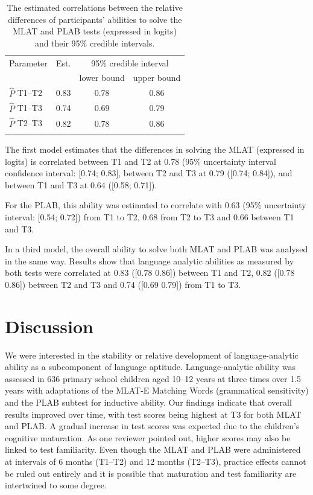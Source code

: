 \documentclass[output=paper]{langsci/langscibook}
\begin{document}
\begin{table}[p]
\caption{\label{tab:10:6}The estimated correlations between the relative differences of participants’ abilities to solve the MLAT and PLAB tests (expressed in logits) and their 95\% credible intervals.}
\begin{tabular}{lccc}
\lsptoprule
Parameter & Est. & \multicolumn{2}{c}{95\% credible interval}\\\cmidrule(lr){3-4}
          &      & lower bound & upper bound\\\midrule
$\hat{P}$ T1--T2 & 0.83 & 0.78 & 0.86\\
$\hat{P}$ T1--T3 & 0.74 & 0.69 & 0.79\\
$\hat{P}$ T2--T3 & 0.82 & 0.78 & 0.86\\
\lspbottomrule
\end{tabular}
\end{table}


The first model estimates that the differences in solving the MLAT (expressed in logits) is correlated between T1 and T2 at 0.78 (95\% uncertainty interval confidence interval: [0.74; 0.83], between T2 and T3 at 0.79 ([0.74; 0.84]), and between T1 and T3 at 0.64 ([0.58; 0.71]). 

For the PLAB, this ability was estimated to correlate with 0.63 (95\% uncertainty interval: [0.54; 0.72]) from T1 to T2, 0.68 from T2 to T3 and 0.66 between T1 and T3.

In a third model, the overall ability to solve both MLAT and PLAB was analysed in the same way. Results show that language analytic abilities as measured by both tests were correlated at 0.83 ([0.78 0.86]) between T1 and T2, 0.82 ([0.78 0.86]) between T2 and T3 and 0.74 ([0.69 0.79]) from T1 to T3.

\section{Discussion}

We were interested in the stability or relative development of language-analytic ability as a subcomponent of language aptitude. Language-analytic ability was assessed in 636 primary school children aged 10--12 years at three times over 1.5 years with adaptations of the MLAT-E Matching Words (grammatical sensitivity) and the PLAB subtest for inductive ability. Our findings indicate that overall results improved over time, with test scores being highest at T3 for both MLAT and PLAB. A gradual increase in test scores was expected due to the children’s cognitive maturation. As one reviewer pointed out, higher scores may also be linked to test familiarity. Even though the MLAT and PLAB were administered at intervals of 6 months (T1--T2) and 12 months (T2--T3), practice effects cannot be ruled out entirely and it is possible that maturation and test familiarity are intertwined to some degree. 
\end{document}
